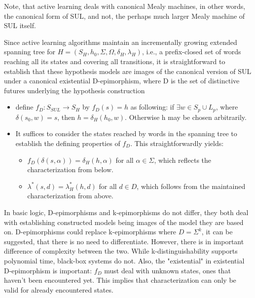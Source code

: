 Note, that active learning deals with canonical Mealy machines, in other words, the canonical form of SUL, and not, the perhaps much larger Mealy machine of SUL itself. 

Since active learning algorithms maintain an incrementally growing extended spanning tree for $H=(S_H, h_0, \Sigma, \Omega, \delta_H, \lambda_H)$, i.e., a prefix-closed set of words reaching all its states and covering all transitions, it is straightforward to establish that these hypothesis models are images of the canonical version of SUL under a canonical existential D-epimorphism, where D is the set of distinctive futures underlying the hypothesis construction\cite{Steffen2011}
\begin{itemize}
	\item define $f_D : S_{SUL}\to S_H$ by $f_D(s) = h$ as following: if $\exists w\in S_p \cup L_p$, where $\delta(s_0, w) = s$, then $h = \delta_H(h_0,w)$. Otherwise h may be chosen arbitrarily.
	\item It suffices to consider the states reached by words in the spanning tree to establish the defining properties of $f_D$. This straightforwardly yields:
	\begin{itemize}
		\item $f_D(\delta(s,\alpha)) = \delta_H(h, \alpha)$ for all $\alpha\in\Sigma$, which reflects the characterization from below.
		\item $\lambda^*(s, d) = \lambda^*_H(h,d)$ for all $d\in D$, which follows from the maintained characterization from above.\cite{Steffen2011}
	\end{itemize}
\end{itemize}

In basic logic, D-epimorphisms and k-epimorphisms do not differ, they both deal with establishing constructed models being images of the model they are based on. D-epimorphisms could replace k-epimorphisms where $D=\Sigma^k$, it can be suggested, that there is no need to differentiate. However, there is in important difference of complexity between the two. While k-distinguishability supports polynomial time, black-box systems do not. Also, the "existential" in existential D-epimorphism is important: $f_D$ must deal with unknown states, ones that haven't been encountered yet. This implies that characterization can only be valid for already encountered states.

